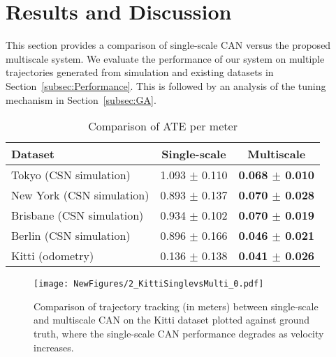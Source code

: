 
\section{Results and Discussion}
\label{sec:results}
This section provides a comparison of single-scale CAN versus the proposed multiscale system.  We evaluate the performance of our system on multiple trajectories generated from simulation and existing datasets in Section~\ref{subsec:Performance}. This is followed by an analysis of the tuning mechanism in Section~\ref{subsec:GA}.

\begin{table}[t]
\vspace{2mm}
\caption{Comparison of ATE per meter}
\label{tab:atecomparison}
\renewcommand{\arraystretch}{1.2}
\setlength{\tabcolsep}{2.5pt}
\label{T_results}
\centering
\begin{tabular}{l|cc}

%
%
%
%
%

%
%
%
%
%


Dataset & Single-scale & Multiscale\\\hline
%
 Tokyo (CSN simulation)& 1.093 $\pm$ 0.110 & \textbf{0.068 $\pm$ 0.010}\\

 New York (CSN simulation)& 0.893 $\pm$ 0.137& \textbf{0.070 $\pm$ 0.028}\\

 Brisbane (CSN simulation)& 0.934 $\pm$ 0.102 & \textbf{0.070 $\pm$ 0.019}\\

 Berlin (CSN simulation)& 0.896 $\pm$ 0.166& \textbf{0.046 $\pm$ 0.021}\\

 Kitti (odometry)& 0.136 $\pm$ 0.138 & \textbf{0.041 $\pm$ 0.026}\\
\end{tabular}
\vspace{-0.2cm}
\end{table}

\begin{figure}[t]
\vspace{2mm}
     \centering
     \texttt{[image: NewFigures/2\_KittiSinglevsMulti\_0.pdf]}  
    \caption{Comparison of trajectory tracking (in meters) between single-scale and multiscale CAN on the Kitti dataset plotted against ground truth, where the single-scale CAN performance degrades as velocity increases.}
    \label{fig:5.6}
\end{figure}

